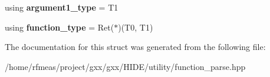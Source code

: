 \begin{DoxyCompactItemize}
\item 
using {\bfseries argument1\+\_\+type} = T1\hypertarget{structsignature2_3_01Ret_07_5_08_07T0_00_01T1_08_4_ad31d2d55ab91ed56888f73e03e1f80fb}{}\label{structsignature2_3_01Ret_07_5_08_07T0_00_01T1_08_4_ad31d2d55ab91ed56888f73e03e1f80fb}

\item 
using {\bfseries function\+\_\+type} = Ret($\ast$)(T0, T1)\hypertarget{structsignature2_3_01Ret_07_5_08_07T0_00_01T1_08_4_ab59f15b060e6a6701aa736a35b14cc56}{}\label{structsignature2_3_01Ret_07_5_08_07T0_00_01T1_08_4_ab59f15b060e6a6701aa736a35b14cc56}

\end{DoxyCompactItemize}


The documentation for this struct was generated from the following file\+:\begin{DoxyCompactItemize}
\item 
/home/rfmeas/project/gxx/gxx/\+H\+I\+D\+E/utility/function\+\_\+parse.\+hpp\end{DoxyCompactItemize}
